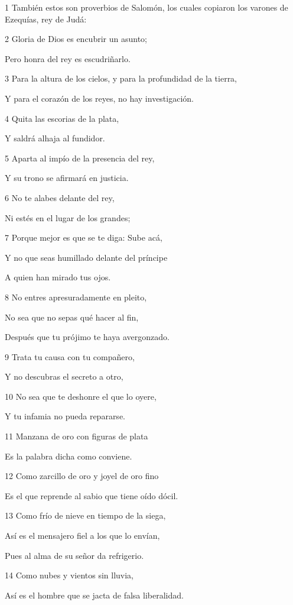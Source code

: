 \par 1 También estos son proverbios de Salomón, los cuales copiaron los varones de Ezequías, rey de Judá: 
\par 2 Gloria de Dios es encubrir un asunto;
\par Pero honra del rey es escudriñarlo.
\par 3 Para la altura de los cielos, y para la profundidad de la tierra,
\par Y para el corazón de los reyes, no hay investigación.
\par 4 Quita las escorias de la plata,
\par Y saldrá alhaja al fundidor.
\par 5 Aparta al impío de la presencia del rey,
\par Y su trono se afirmará en justicia.
\par 6 No te alabes delante del rey,
\par Ni estés en el lugar de los grandes;
\par 7 Porque mejor es que se te diga: Sube acá,
\par Y no que seas humillado delante del príncipe
\par A quien han mirado tus ojos. 
\par 8 No entres apresuradamente en pleito,
\par No sea que no sepas qué hacer al fin,
\par Después que tu prójimo te haya avergonzado.
\par 9 Trata tu causa con tu compañero,
\par Y no descubras el secreto a otro,
\par 10 No sea que te deshonre el que lo oyere,
\par Y tu infamia no pueda repararse.
\par 11 Manzana de oro con figuras de plata
\par Es la palabra dicha como conviene.
\par 12 Como zarcillo de oro y joyel de oro fino
\par Es el que reprende al sabio que tiene oído dócil.
\par 13 Como frío de nieve en tiempo de la siega,
\par Así es el mensajero fiel a los que lo envían,
\par Pues al alma de su señor da refrigerio.
\par 14 Como nubes y vientos sin lluvia,
\par Así es el hombre que se jacta de falsa liberalidad.
